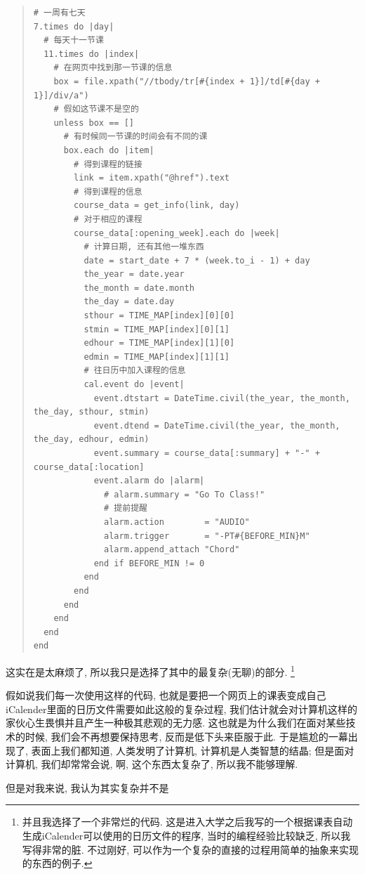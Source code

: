 \begin{quotation}
  \begin{verbatim}
# 一周有七天
7.times do |day|
  # 每天十一节课
  11.times do |index|
    # 在网页中找到那一节课的信息
    box = file.xpath("//tbody/tr[#{index + 1}]/td[#{day + 1}]/div/a")
    # 假如这节课不是空的
    unless box == []
      # 有时候同一节课的时间会有不同的课
      box.each do |item|
        # 得到课程的链接
        link = item.xpath("@href").text
        # 得到课程的信息
        course_data = get_info(link, day)
        # 对于相应的课程
        course_data[:opening_week].each do |week|
          # 计算日期, 还有其他一堆东西
          date = start_date + 7 * (week.to_i - 1) + day
          the_year = date.year
          the_month = date.month
          the_day = date.day
          sthour = TIME_MAP[index][0][0]
          stmin = TIME_MAP[index][0][1]
          edhour = TIME_MAP[index][1][0]
          edmin = TIME_MAP[index][1][1]
          # 往日历中加入课程的信息
          cal.event do |event|
            event.dtstart = DateTime.civil(the_year, the_month, the_day, sthour, stmin)
            event.dtend = DateTime.civil(the_year, the_month, the_day, edhour, edmin)
            event.summary = course_data[:summary] + "-" + course_data[:location]
            event.alarm do |alarm|
              # alarm.summary = "Go To Class!"
              # 提前提醒
              alarm.action        = "AUDIO"
              alarm.trigger       = "-PT#{BEFORE_MIN}M"
              alarm.append_attach "Chord"
            end if BEFORE_MIN != 0
          end
        end
      end
    end
  end
end
  \end{verbatim}
\end{quotation}

这实在是太麻烦了, 所以我只是选择了其中的最复杂(无聊)的部分. \footnote{并且我选择了一个非常烂的代码. 这是进入大学之后我写的一个根据课表自动生成iCalender可以使用的日历文件的程序, 当时的编程经验比较缺乏, 所以我写得非常的脏. 不过刚好, 可以作为一个复杂的直接的过程用简单的抽象来实现的东西的例子. }

假如说我们每一次使用这样的代码, 也就是要把一个网页上的课表变成自己iCalender里面的日历文件需要如此这般的复杂过程, 我们估计就会对计算机这样的家伙心生畏惧并且产生一种极其悲观的无力感. 这也就是为什么我们在面对某些技术的时候, 我们会不再想要保持思考, 反而是低下头来臣服于此. 于是尴尬的一幕出现了, 表面上我们都知道, 人类发明了计算机, 计算机是人类智慧的结晶; 但是面对计算机, 我们却常常会说, 啊, 这个东西太复杂了, 所以我不能够理解. 

但是对我来说, 我认为其实复杂并不是
